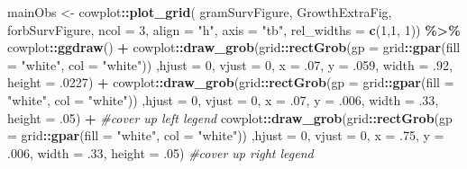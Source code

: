 \documentclass[
]{article}
\newenvironment{Shaded}{\begin{snugshade}}{\end{snugshade}}
\newcommand{\CommentTok}[1]{\textcolor[rgb]{0.56,0.35,0.01}{\textit{#1}}}
\newcommand{\DataTypeTok}[1]{\textcolor[rgb]{0.13,0.29,0.53}{#1}}
\newcommand{\DecValTok}[1]{\textcolor[rgb]{0.00,0.00,0.81}{#1}}
\newcommand{\FloatTok}[1]{\textcolor[rgb]{0.00,0.00,0.81}{#1}}
\newcommand{\KeywordTok}[1]{\textcolor[rgb]{0.13,0.29,0.53}{\textbf{#1}}}
\newcommand{\NormalTok}[1]{#1}
\newcommand{\OperatorTok}[1]{\textcolor[rgb]{0.81,0.36,0.00}{\textbf{#1}}}
\newcommand{\StringTok}[1]{\textcolor[rgb]{0.31,0.60,0.02}{#1}}
\begin{document}
\begin{Shaded}
\begin{Highlighting}[]
\NormalTok{mainObs \textless{}{-}}\StringTok{ }\NormalTok{cowplot}\OperatorTok{::}\KeywordTok{plot\_grid}\NormalTok{( gramSurvFigure, GrowthExtraFig, forbSurvFigure, }\DataTypeTok{ncol =} \DecValTok{3}\NormalTok{, }\DataTypeTok{align =} \StringTok{"h"}\NormalTok{, }\DataTypeTok{axis =} \StringTok{"tb"}\NormalTok{, }\DataTypeTok{rel\_widths =} \KeywordTok{c}\NormalTok{(}\DecValTok{1}\NormalTok{,}\DecValTok{1}\NormalTok{, }\DecValTok{1}\NormalTok{)) }\OperatorTok{\%\textgreater{}\%}\StringTok{ }
\StringTok{  }\NormalTok{cowplot}\OperatorTok{::}\KeywordTok{ggdraw}\NormalTok{() }\OperatorTok{+}\StringTok{ }
\StringTok{  }\NormalTok{cowplot}\OperatorTok{::}\KeywordTok{draw\_grob}\NormalTok{(grid}\OperatorTok{::}\KeywordTok{rectGrob}\NormalTok{(}\DataTypeTok{gp =}\NormalTok{ grid}\OperatorTok{::}\KeywordTok{gpar}\NormalTok{(}\DataTypeTok{fill =} \StringTok{"white"}\NormalTok{, }\DataTypeTok{col =} \StringTok{"white"}\NormalTok{)) ,}\DataTypeTok{hjust =} \DecValTok{0}\NormalTok{, }\DataTypeTok{vjust =} \DecValTok{0}\NormalTok{, }\DataTypeTok{x =} \FloatTok{.07}\NormalTok{, }\DataTypeTok{y =} \FloatTok{.059}\NormalTok{, }\DataTypeTok{width =} \FloatTok{.92}\NormalTok{, }\DataTypeTok{height =} \FloatTok{.0227}\NormalTok{) }\OperatorTok{+}
\StringTok{  }\NormalTok{cowplot}\OperatorTok{::}\KeywordTok{draw\_grob}\NormalTok{(grid}\OperatorTok{::}\KeywordTok{rectGrob}\NormalTok{(}\DataTypeTok{gp =}\NormalTok{ grid}\OperatorTok{::}\KeywordTok{gpar}\NormalTok{(}\DataTypeTok{fill =} \StringTok{"white"}\NormalTok{, }\DataTypeTok{col =} \StringTok{"white"}\NormalTok{)) ,}\DataTypeTok{hjust =} \DecValTok{0}\NormalTok{, }\DataTypeTok{vjust =} \DecValTok{0}\NormalTok{, }\DataTypeTok{x =} \FloatTok{.07}\NormalTok{, }\DataTypeTok{y =} \FloatTok{.006}\NormalTok{, }\DataTypeTok{width =} \FloatTok{.33}\NormalTok{, }\DataTypeTok{height =} \FloatTok{.05}\NormalTok{) }\OperatorTok{+}\StringTok{ }\CommentTok{\#cover up left legend }
\StringTok{  }\NormalTok{cowplot}\OperatorTok{::}\KeywordTok{draw\_grob}\NormalTok{(grid}\OperatorTok{::}\KeywordTok{rectGrob}\NormalTok{(}\DataTypeTok{gp =}\NormalTok{ grid}\OperatorTok{::}\KeywordTok{gpar}\NormalTok{(}\DataTypeTok{fill =} \StringTok{"white"}\NormalTok{, }\DataTypeTok{col =} \StringTok{"white"}\NormalTok{)) ,}\DataTypeTok{hjust =} \DecValTok{0}\NormalTok{, }\DataTypeTok{vjust =} \DecValTok{0}\NormalTok{, }\DataTypeTok{x =} \FloatTok{.75}\NormalTok{, }\DataTypeTok{y =} \FloatTok{.006}\NormalTok{, }\DataTypeTok{width =} \FloatTok{.33}\NormalTok{, }\DataTypeTok{height =} \FloatTok{.05}\NormalTok{) }\CommentTok{\#cover up right legend}


\end{Highlighting}
\end{Shaded}
\end{document}
